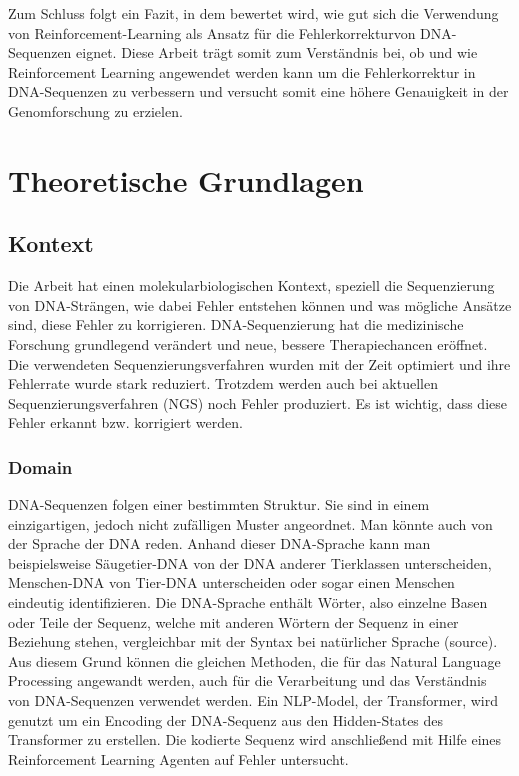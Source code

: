 \documentclass[oneside,bibliography=totocnumbered,BCOR=5mm]{scrbook}%
\theoremstyle{definition}
\theoremstyle{definition}
\theoremstyle{definition}
\theoremstyle{definition}
\theoremstyle{definition}
\theoremstyle{definition}
\begin{document}
Zum Schluss folgt ein Fazit, in dem bewertet wird, wie gut sich die Verwendung von Reinforcement-Learning 
als Ansatz für die Fehlerkorrekturvon DNA-Sequenzen eignet. Diese Arbeit trägt somit zum Verständnis bei, ob und wie Reinforcement Learning angewendet werden kann um die Fehlerkorrektur in 
DNA-Sequenzen zu verbessern und versucht somit eine höhere Genauigkeit in der Genomforschung zu erzielen.\\
\linebreak[4]


\chapter{Theoretische Grundlagen}

\section{Kontext}

Die Arbeit hat einen molekularbiologischen Kontext, speziell die Sequenzierung von DNA-Strängen, 
wie dabei Fehler entstehen können und was mögliche Ansätze sind, diese Fehler zu korrigieren.
DNA-Sequenzierung hat die medizinische Forschung grundlegend verändert und neue, bessere Therapiechancen eröffnet. 
Die verwendeten Sequenzierungsverfahren wurden mit der Zeit optimiert und ihre Fehlerrate wurde stark reduziert. 
Trotzdem werden auch bei aktuellen Sequenzierungsverfahren (NGS) noch Fehler produziert. 
Es ist wichtig, dass diese Fehler erkannt bzw. korrigiert werden.\\
\linebreak[4]

\subsection{Domain} 

DNA-Sequenzen folgen einer bestimmten Struktur. Sie sind in einem einzigartigen, jedoch nicht zufälligen Muster angeordnet. 
Man könnte auch von der Sprache der DNA reden. 
Anhand dieser DNA-Sprache kann man beispielsweise Säugetier-DNA von der DNA anderer Tierklassen unterscheiden, 
Menschen-DNA von Tier-DNA unterscheiden oder sogar einen Menschen eindeutig identifizieren.
Die DNA-Sprache enthält Wörter, also einzelne Basen oder Teile der Sequenz, welche mit anderen Wörtern der Sequenz in einer Beziehung stehen, vergleichbar mit der Syntax bei natürlicher Sprache (source).
Aus diesem Grund können die gleichen Methoden, die für das Natural Language Processing angewandt werden, auch für die Verarbeitung und das Verständnis von DNA-Sequenzen verwendet werden.
Ein NLP-Model, der Transformer, wird genutzt um ein Encoding der DNA-Sequenz aus den Hidden-States des Transformer zu erstellen. 
Die kodierte Sequenz wird anschließend mit Hilfe eines Reinforcement Learning Agenten auf Fehler untersucht. \\
\end{document}
